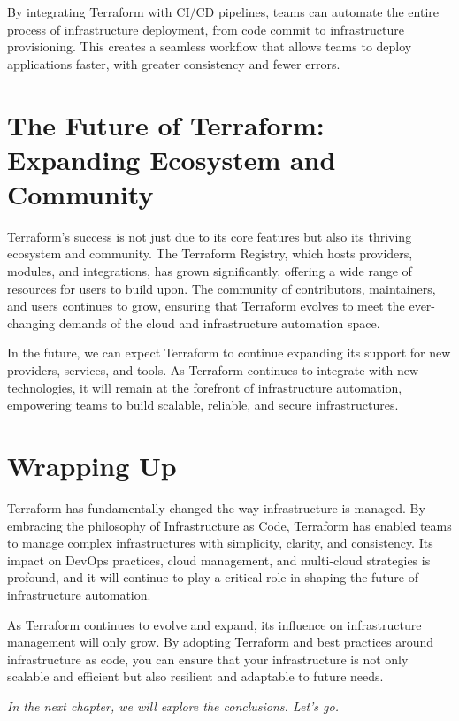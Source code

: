 By integrating Terraform with CI/CD pipelines, teams can automate the entire process of infrastructure deployment, from code commit to infrastructure provisioning. This creates a seamless workflow that allows teams to deploy applications faster, with greater consistency and fewer errors.

\section{The Future of Terraform: Expanding Ecosystem and Community}

Terraform's success is not just due to its core features but also its thriving ecosystem and community. The Terraform Registry, which hosts providers, modules, and integrations, has grown significantly, offering a wide range of resources for users to build upon. The community of contributors, maintainers, and users continues to grow, ensuring that Terraform evolves to meet the ever-changing demands of the cloud and infrastructure automation space.

In the future, we can expect Terraform to continue expanding its support for new providers, services, and tools. As Terraform continues to integrate with new technologies, it will remain at the forefront of infrastructure automation, empowering teams to build scalable, reliable, and secure infrastructures.

\section{Wrapping Up}

Terraform has fundamentally changed the way infrastructure is managed. By embracing the philosophy of Infrastructure as Code, Terraform has enabled teams to manage complex infrastructures with simplicity, clarity, and consistency. Its impact on DevOps practices, cloud management, and multi-cloud strategies is profound, and it will continue to play a critical role in shaping the future of infrastructure automation.

As Terraform continues to evolve and expand, its influence on infrastructure management will only grow. By adopting Terraform and best practices around infrastructure as code, you can ensure that your infrastructure is not only scalable and efficient but also resilient and adaptable to future needs.

\vspace{1em}

\textit{In the next chapter, we will explore the conclusions. Let's go.}
